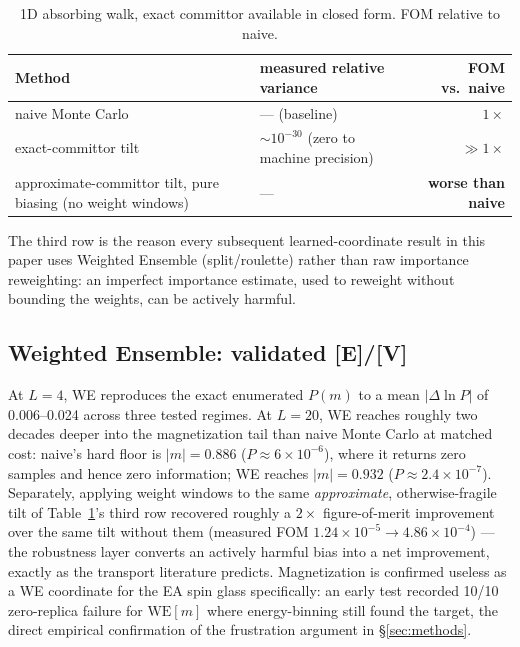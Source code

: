 \documentclass[a4paper,fleqn]{cas-sc}
\begin{document}
\begin{table}[H]
\centering\small
\caption{1D absorbing walk, exact committor available in closed form. FOM relative to naive.}
\label{tab:demo}
\begin{tabular}{p{5.4cm}p{4.4cm}r}
	\toprule
	Method & measured relative variance & FOM vs.\ naive \\
	\midrule
	naive Monte Carlo & --- (baseline) & $1\times$ \\
	exact-committor tilt & $\sim10^{-30}$ (zero to machine precision) & $\gg1\times$ \\
	approximate-committor tilt, pure biasing (no weight windows) & --- & \textbf{worse than naive} \\
	\bottomrule
\end{tabular}
\end{table}

The third row is the reason every subsequent learned-coordinate result in this paper uses
Weighted Ensemble (split/roulette) rather than raw importance reweighting: an imperfect
importance estimate, used to reweight without bounding the weights, can be actively harmful.

\subsection{Weighted Ensemble: validated \textbf{[E]/[V]}}\label{sec:res-we}
At $L=4$, WE reproduces the exact enumerated $P(m)$ to a mean $|\Delta\ln P|$ of
0.006--0.024 across three tested regimes. At $L=20$, WE reaches roughly two decades deeper
into the magnetization tail than naive Monte Carlo at matched cost: naive's hard floor is
$|m|=0.886$ ($P\approx6\times10^{-6}$), where it returns zero samples and hence zero
information; WE reaches $|m|=0.932$ ($P\approx2.4\times10^{-7}$). Separately, applying
weight windows to the same \emph{approximate}, otherwise-fragile tilt of
Table~\ref{tab:demo}'s third row recovered roughly a $2\times$ figure-of-merit improvement
over the same tilt without them (measured FOM $1.24\times10^{-5}\to4.86\times10^{-4}$) ---
the robustness layer converts an actively harmful bias into a net improvement, exactly as
the transport literature predicts. Magnetization is confirmed useless as a WE coordinate
for the EA spin glass specifically: an early test recorded 10/10 zero-replica failure for
$\mathrm{WE}[m]$ where energy-binning still found the target, the direct empirical
confirmation of the frustration argument in \S\ref{sec:methods}.
\end{document}
